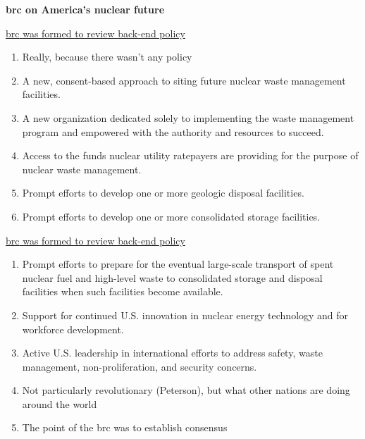 \documentclass[aspectratio=1610,pdftex,dvipsnames,compress,xcolor={dvipsnames}]{beamer}
\newcommand{\acl}{\acrlong} %
\newcommand{\acs}{\acrshort} %
\begin{document}
\begin{frame}[plain]{}
    \centering\LARGE\textbf{\acl{brc} on America's nuclear future}
\end{frame}


\addtocounter{framenumber}{-3} 
\begin{frame}{\href{https://uidaho.pressbooks.pub/nuclearengineering/chapter/back-end-of-the-fuel-cycle/}{\acl{brc} was formed to review back-end policy}}
    \begin{enumerate}[series=blue,topsep=0pt,itemsep=21pt,leftmargin=*,label=(\arabic*)]
        \item[]Really, because there wasn't any policy
            \vspace{0.05in}
        \item A new, consent-based approach to siting future nuclear waste management facilities.
        \item A new organization dedicated solely to implementing the waste management program and empowered with the authority and resources to succeed.
        \item Access to the funds nuclear utility ratepayers are providing for the purpose of nuclear waste management.
        \item Prompt efforts to develop one or more geologic disposal facilities.
        \item Prompt efforts to develop one or more consolidated storage facilities.
    \end{enumerate}
\end{frame}


\begin{frame}{\href{https://uidaho.pressbooks.pub/nuclearengineering/chapter/back-end-of-the-fuel-cycle/}{\acl{brc} was formed to review back-end policy}}
    \begin{enumerate}[resume=blue,topsep=0pt,itemsep=21pt,leftmargin=*,label=(\arabic*)]
        \item Prompt efforts to prepare for the eventual large-scale transport of spent nuclear fuel and high-level waste to consolidated storage and disposal facilities when such facilities become available.
        \item Support for continued U.S. innovation in nuclear energy technology and for workforce development.
        \item Active U.S. leadership in international efforts to address safety, waste management, non-proliferation, and
            \vspace{0.05in}
security concerns.
        \item[] Not particularly revolutionary (Peterson), but what other nations are doing around the world
        \item[] The point of the \acs{brc} was to establish consensus
    \end{enumerate}
\end{frame}
\end{document}
